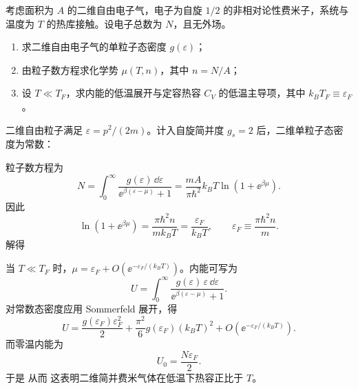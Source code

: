 \begin{question}
考虑面积为 $A$ 的二维自由电子气，电子为自旋 $1/2$ 的非相对论性费米子，系统与温度为 $T$ 的热库接触。设电子总数为 $N$，且无外场。

\begin{enumerate}[label=(\arabic*),leftmargin=2.5em]
  \item 求二维自由电子气的单粒子态密度 $g(\varepsilon)$；
  \item 由粒子数方程求化学势 $\mu(T,n)$，其中 $n=N/A$；
  \item 设 $T\ll T_F$，求内能的低温展开与定容热容 $C_V$ 的低温主导项，其中 $k_B T_F\equiv \varepsilon_F$。
\end{enumerate}

\begin{solution}
二维自由粒子满足 $\varepsilon=p^2/(2m)$。计入自旋简并度 $g_s=2$ 后，二维单粒子态密度为常数：

粒子数方程为
\[
N=\int_0^\infty \frac{g(\varepsilon)\,\dd{\varepsilon}}{\ee^{\beta(\varepsilon-\mu)}+1}
=\frac{mA}{\pi\hbar^2}k_B T\ln\left(1+\ee^{\beta\mu}\right).
\]
因此
\[
\ln(1+\ee^{\beta\mu})=\frac{\pi\hbar^2 n}{m k_B T}=\frac{\varepsilon_F}{k_B T},
\qquad
\varepsilon_F\equiv \frac{\pi\hbar^2 n}{m}.
\]
解得

当 $T\ll T_F$ 时，$\mu=\varepsilon_F+O(\ee^{-\varepsilon_F/(k_B T)})$。内能可写为
\[
U=\int_0^\infty \frac{g(\varepsilon)\,\varepsilon\,\dd{\varepsilon}}{\ee^{\beta(\varepsilon-\mu)}+1}.
\]
对常数态密度应用 Sommerfeld 展开，得
\[
U=\frac{g(\varepsilon_F)\varepsilon_F^2}{2}+\frac{\pi^2}{6}g(\varepsilon_F)(k_B T)^2+O\!\left(\ee^{-\varepsilon_F/(k_B T)}\right).
\]
而零温内能为
\[
U_0=\frac{N\varepsilon_F}{2}.
\]
于是
从而
这表明二维简并费米气体在低温下热容正比于 $T$。
\end{solution}
\end{question}


